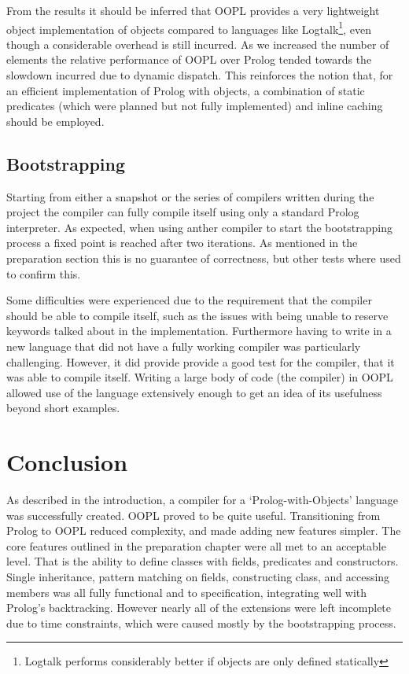 \documentclass[12pt,a4paper,twoside,openright]{report}
\begin{document}
\bigskip

From the results it should be inferred that OOPL provides a very lightweight object implementation of objects compared to languages like Logtalk\footnote{Logtalk performs considerably better if objects are only defined statically}, even though a considerable overhead is still incurred. As we increased the number of elements the relative performance of OOPL over Prolog tended towards the slowdown incurred due to dynamic dispatch. This reinforces the notion that, for an efficient implementation of Prolog with objects, a combination of static predicates (which were planned but not fully implemented) and inline caching should be employed.

\section{Bootstrapping}

Starting from either a snapshot or the series of compilers written during the project the compiler can fully compile itself using only a standard Prolog interpreter. As expected, when using anther compiler to start the bootstrapping process a fixed point is reached after two iterations. As mentioned in the preparation section this is no guarantee of correctness, but other tests where used to confirm this.

\bigskip

Some difficulties were experienced due to the requirement that the compiler should be able to compile itself, such as the issues with being unable to reserve keywords talked about in the implementation. Furthermore having to write in a new language that did not have a fully working compiler was particularly challenging. However, it did provide provide a good test for the compiler, that it was able to compile itself. Writing a large body of code (the compiler) in OOPL allowed use of the language extensively enough to get an idea of its usefulness beyond short examples.

\chapter{Conclusion}

As described in the introduction, a compiler for a `Prolog-with-Objects' language was successfully created. OOPL proved to be quite useful. Transitioning from Prolog to OOPL reduced complexity, and made adding new features simpler. The core features outlined in the preparation chapter were all met to an acceptable level. That is the ability to define classes with fields, predicates and constructors. Single inheritance, pattern matching on fields, constructing class, and accessing members was all fully functional and to specification, integrating well with Prolog's backtracking. However nearly all of the extensions were left incomplete due to time constraints, which were caused mostly by the bootstrapping process.
\end{document}

